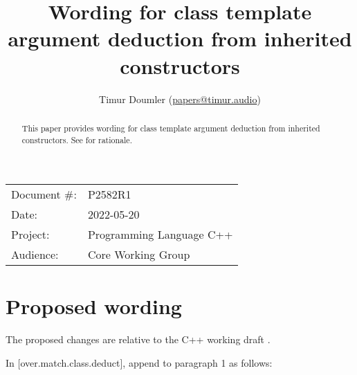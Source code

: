 

\newcommand{\forceindent}{\parindent=1em\indent\parindent=0pt\relax} %



\title{Wording for class template argument deduction from inherited constructors}
\author{
  Timur Doumler \small(\href{mailto:papers@timur.audio}{papers@timur.audio})
}
\date{}
\maketitle

\begin{tabular}{ll}
Document \#: & P2582R1 \\
Date: & 2022-05-20\\
Project: & Programming Language C++ \\
Audience: & Core Working Group
\end{tabular}


\begin{abstract}
This paper provides wording for class template argument deduction from inherited constructors. See \cite{P1021R6} for rationale.
\end{abstract}
\vspace{5mm}
\section{Proposed wording}

The proposed changes are relative to the C++ working draft \cite{N4910}. 

In [over.match.class.deduct], append to paragraph 1 as follows:

